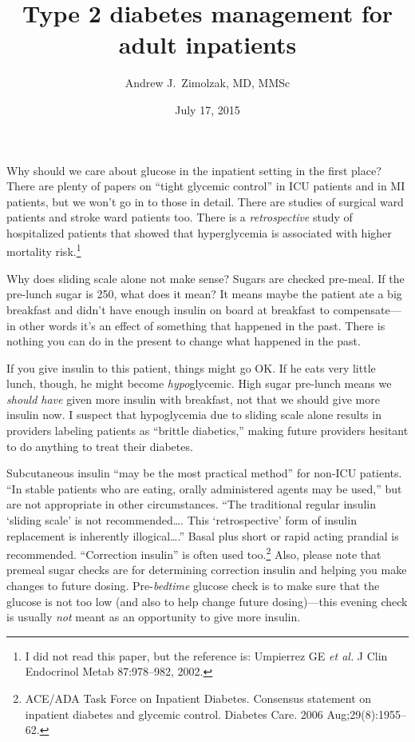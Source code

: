\documentclass{article}
\title{Type 2 diabetes management for adult inpatients}
\author{Andrew J.\ Zimolzak, MD, MMSc}
\date{July 17, 2015}
\begin{document}
\maketitle


Why should we care about glucose in the inpatient setting in the first
place? There are plenty of papers on ``tight glycemic control'' in ICU
patients and in MI patients, but we won't go in to those in
detail. There are studies of surgical ward patients and stroke ward
patients too. There is a \emph{retrospective} study of hospitalized
patients that showed that hyperglycemia is associated with higher
mortality risk.\footnote{I did not read this paper, but the reference
  is: Umpierrez GE \emph{et al.} J Clin Endocrinol Metab 87:978--982,
  2002.}

Why does sliding scale alone not make sense? Sugars are checked
pre-meal. If the pre-lunch sugar is 250, what does it mean? It means
maybe the patient ate a big breakfast and didn't have enough insulin
on board at breakfast to compensate---in other words it's an effect
of something that happened in the past. There is nothing you can do in
the present to change what happened in the past.

If you give insulin to this patient, things might go OK. If he eats
very little lunch, though, he might become \emph{hypo}glycemic. High
sugar pre-lunch means we \emph{should have} given more insulin with
breakfast, not that we should give more insulin now. I suspect that
hypoglycemia due to sliding scale alone results in providers labeling
patients as ``brittle diabetics,'' making future providers hesitant to
do anything to treat their diabetes.

Subcutaneous insulin ``may be the most practical method'' for non-ICU
patients. ``In stable patients who are eating, orally administered
agents may be used,'' but are not appropriate in other
circumstances. ``The traditional regular insulin `sliding scale' is
not recommended\ldots{}. This `retrospective' form of insulin
replacement is inherently illogical\ldots{}.'' Basal plus short or
rapid acting prandial is recommended. ``Correction insulin'' is often
used too.\footnote{ACE/ADA Task Force on Inpatient Diabetes. Consensus
  statement on inpatient diabetes and glycemic control. Diabetes
  Care. 2006 Aug;29(8):1955--62.} Also, please note that premeal sugar
checks are for determining correction insulin and helping you make
changes to future dosing. Pre-\emph{bedtime} glucose check is to make
sure that the glucose is not too low (and also to help change future
dosing)---this evening check is usually \emph{not} meant as an
opportunity to give more insulin.
\end{document}
